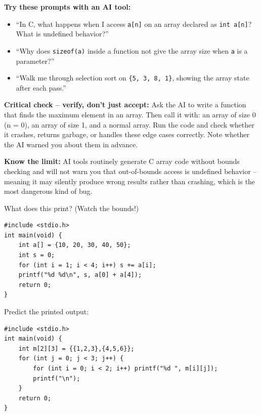 \documentclass[11pt]{article}
\begin{document}
\begin{aicollab}
\textbf{Try these prompts with an AI tool:}
\begin{itemize}[leftmargin=*,nosep]
  \item ``In C, what happens when I access \texttt{a[n]} on an array declared as
        \texttt{int a[n]}? What is undefined behavior?''
  \item ``Why does \texttt{sizeof(a)} inside a function not give the array size when
        \texttt{a} is a parameter?''
  \item ``Walk me through selection sort on \texttt{\{5, 3, 8, 1\}}, showing the
        array state after each pass.''
\end{itemize}

\medskip\textbf{Critical check -- verify, don't just accept:}
Ask the AI to write a function that finds the maximum element in an array. Then call
it with: an array of size 0 (n = 0), an array of size 1, and a normal array.
Run the code and check whether it crashes, returns garbage, or handles these edge cases
correctly. Note whether the AI warned you about them in advance.

\medskip\textbf{Know the limit:}
AI tools routinely generate C array code without bounds checking and will not warn you
that out-of-bounds access is undefined behavior -- meaning it may silently produce wrong
results rather than crashing, which is the most dangerous kind of bug.
\end{aicollab}

\takehomebanner

\begin{trace}[Indexing]
What does this print? (Watch the bounds!)
\begin{lstlisting}
#include <stdio.h>
int main(void) {
    int a[] = {10, 20, 30, 40, 50};
    int s = 0;
    for (int i = 1; i < 4; i++) s += a[i];
    printf("%d %d\n", s, a[0] + a[4]);
    return 0;
}
\end{lstlisting}
\end{trace}

\begin{trace}[2D traversal]
Predict the printed output:
\begin{lstlisting}
#include <stdio.h>
int main(void) {
    int m[2][3] = {{1,2,3},{4,5,6}};
    for (int j = 0; j < 3; j++) {
        for (int i = 0; i < 2; i++) printf("%d ", m[i][j]);
        printf("\n");
    }
    return 0;
}
\end{lstlisting}
\end{trace}
\end{document}
